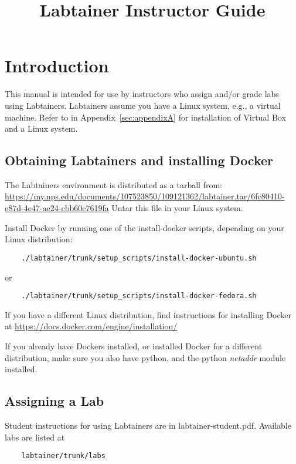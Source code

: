 \documentclass{article}
\begin{document}
\title {Labtainer Instructor Guide\vspace{-4ex}}
\maketitle

\section {Introduction}
This manual is intended for use by instructors who assign and/or grade
labs using Labtainers.
Labtainers assume you have a Linux system, e.g., a virtual machine.  Refer to
in Appendix~\ref{sec:appendixA} for installation of Virtual Box and a Linux system.

\subsection{Obtaining Labtainers and installing Docker}
The Labtainers environment is distributed as a tarball from:
\url{https://my.nps.edu/documents/107523850/109121362/labtainer.tar/6fc80410-e87d-4e47-ae24-cbb60c7619fa}
Untar this file in your Linux system.

Install Docker by running one of the install-docker scripts, depending on your Linux
distribution:
\begin{verbatim}
    ./labtainer/trunk/setup_scripts/install-docker-ubuntu.sh
\end{verbatim}
\noindent or 
\begin{verbatim}
    ./labtainer/trunk/setup_scripts/install-docker-fedora.sh
\end{verbatim}
If you have a different Linux distribution, find instructions for installing Docker at
\url{https://docs.docker.com/engine/installation/}

If you already have Dockers installed, or installed Docker for a different distribution,
make sure you also have python, and
the python \textit{netaddr} module installed.

\subsection{Assigning a Lab}
Student instructions for using Labtainers are in labtainer-student.pdf.  Available labs are
listed at 
\begin{verbatim}
    labtainer/trunk/labs
\end{verbatim}
\end{document}
